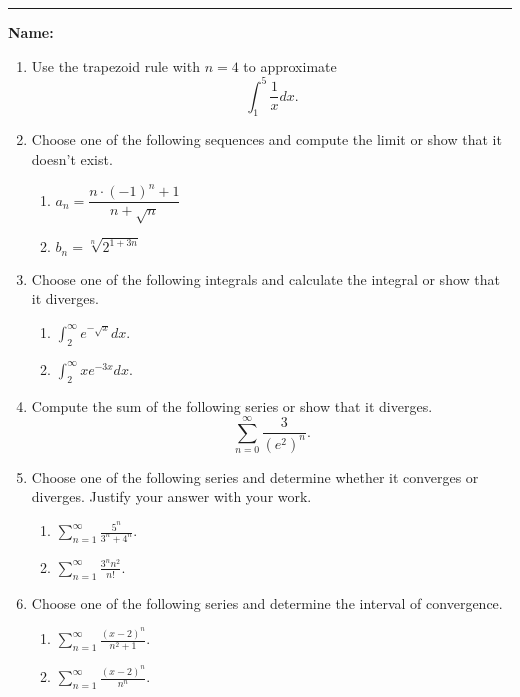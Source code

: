 \documentclass[11pt]{article}
\begin{document}
    \hrule
    \vspace{.5cm}
    \noindent\textbf{Name:} \underline{\qquad\qquad\qquad\qquad\qquad\qquad\qquad\qquad\qquad\qquad\qquad\qquad\qquad}

    \begin{enumerate}
        \item Use the trapezoid rule with $n=4$ to approximate 
        $$\int_{1}^{5}\frac{1}{x}dx.$$

        \item Choose one of the following sequences and compute the limit or show that it doesn't exist.
        \begin{enumerate}
            \item $a_{n}=\dfrac{n\cdot(-1)^n+1}{n+\sqrt{n}}$
            
            \item $b_{n}=\sqrt[n]{2^{1+3n}}$
        \end{enumerate}

        \item Choose one of the following integrals and calculate the integral or show that it diverges.
        \begin{enumerate}
            \item $\displaystyle\int_{2}^{\infty}e^{-\sqrt{x}}dx$.
            \item $\displaystyle\int_{2}^{\infty}xe^{-3x}dx$.
        \end{enumerate}
        
        \item Compute the sum of the following series or show that it diverges.
        $$\sum_{n=0}^{\infty}\frac{3}{(e^2)^{n}}.$$

        \item Choose one of the following series and determine whether it converges or diverges. Justify your answer with your work.
        \begin{enumerate}
            \item $\displaystyle\sum_{n=1}^{\infty}\frac{5^n}{3^n+4^n}$.
            \item $\displaystyle\sum_{n=1}^{\infty}\frac{3^{n}n^2}{n!}$.
        \end{enumerate}

        \item Choose one of the following series and determine the interval of convergence.
        \begin{enumerate}
            \item $\displaystyle\sum_{n=1}^{\infty}\frac{(x-2)^n}{n^2+1}$.
            \item $\displaystyle\sum_{n=1}^{\infty}\frac{(x-2)^n}{n^n}$.
        \end{enumerate}
    \end{enumerate}
\end{document}
